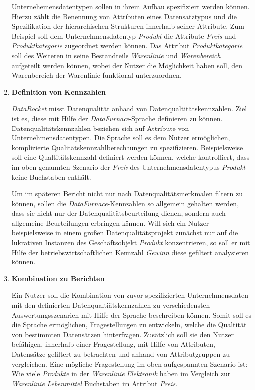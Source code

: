 \documentclass[
  language=german, %
  type=bachelor,%
  ngerman
]{isthesis}
\begin{document}
\begin{content}
\begin{enumerate}
        Unternehemensdatentypen sollen in ihrem Aufbau spezifiziert werden
        können. Hierzu zählt die Benennung von Attributen eines Datensatztypus
        und die Spezifikation der hierarchischen Strukturen innerhalb seiner
        Attribute. Zum Beispiel soll dem Unternehmensdatentyp \textit{Produkt}
        die Attribute \textit{Preis} und \textit{Produktkategorie} zugeordnet
        werden können. Das Attribut \textit{Produktkategorie} soll des Weiteren
        in seine Bestandteile \textit{Warenlinie} und \textit{Warenbereich}
        aufgeteilt werden können, wobei der Nutzer die Möglichkeit haben soll,
        den Warenbereich der Warenlinie funktional unterzuordnen.

      \item \textbf{Definition von Kennzahlen} 

        \textit{DataRocket} misst Datenqualität anhand von
        Datenqualtitätskennzahlen. Ziel ist es, diese mit Hilfe der
        \textit{DataFurnace}-Sprache definieren zu können.
        Datenqualitätskennzahlen beziehen sich auf Attribute von
        Unternehmensdatentypen. Die Sprache soll es dem Nutzer ermöglichen,
        komplizierte Qualitätskennzahlberechnungen zu spezifizieren. Beispielsweise
        soll eine Qualtitätskennzahl definiert werden können,
        welche kontrolliert, dass im oben genannten Szenario der \textit{Preis}
        des Unternehmensdatentypus \textit{Produkt} keine Buchstaben enthält.

        Um im späteren Bericht nicht nur nach Datenqualitätsmerkmalen filtern
        zu können, sollen die \textit{DataFurnace}-Kennzahlen so allgemein
        gehalten werden, dass sie nicht nur der Datenqualitätsbeurteilung
        dienen, sondern auch allgemeine Beurteilungen erbringen können. Will
        sich ein Nutzer beispielsweise in einem großen Datenqualitätsprojekt
        zunächst nur auf die lukrativen Instanzen des Geschäftsobjekt
        \textit{Produkt} konzentrieren, so soll er mit Hilfe der
        betriebswirtschaftlichen Kennzahl \textit{Gewinn} diese gefiltert
        analysieren können.
        
      \item \textbf{Kombination zu Berichten}

        Ein Nutzer soll die Kombination von zuvor spezifizierten
        Unternehmensdaten mit den definierten Datenqualtiätskennzahlen zu
        verschiedensten Auswertungsszenarien mit Hilfe der Sprache beschreiben
        können. Somit soll es die Sprache ermöglichen, Fragestellungen zu
        entwickeln, welche die Qualtität von bestimmten Datensätzen hinterfragen.
        Zusätzlich soll sie den Nutzer befähigen, innerhalb einer
        Fragestellung, mit Hilfe von Attributen, Datensätze gefiltert zu
        betrachten und anhand von Attributgruppen zu vergleichen. Eine mögliche
        Fragestellung im oben aufgespannten Szenario ist: Wie viele
        \textit{Produkte} in der \textit{Warenlinie} \textit{Elektronik} haben
        im Vergleich zur \textit{Warenlinie} \textit{Lebenmittel} Buchstaben im
        Attribut \textit{Preis}.
    \end{enumerate}


\end{content}
\end{document}
